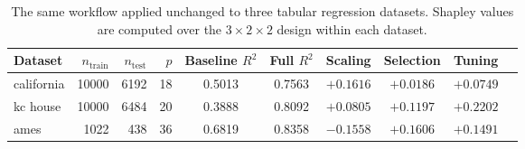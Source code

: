 \begin{table}[htbp]
\centering
\caption{The same workflow applied unchanged to three tabular regression datasets. Shapley values are computed over the $3 \times 2 \times 2$ design within each dataset.}\label{tab:datasets}
\small
\begin{tabular}{lrrrcccccc}
\toprule
Dataset & $n_{\text{train}}$ & $n_{\text{test}}$ & $p$ & Baseline $R^2$ & Full $R^2$ & Scaling & Selection & Tuning \\
\midrule
california & 10000 & 6192 & 18 & 0.5013 & 0.7563 & $+0.1616$ & $+0.0186$ & $+0.0749$ \\
kc house & 10000 & 6484 & 20 & 0.3888 & 0.8092 & $+0.0805$ & $+0.1197$ & $+0.2202$ \\
ames & 1022 & 438 & 36 & 0.6819 & 0.8358 & $-0.1558$ & $+0.1606$ & $+0.1491$ \\
\bottomrule
\end{tabular}
\end{table}